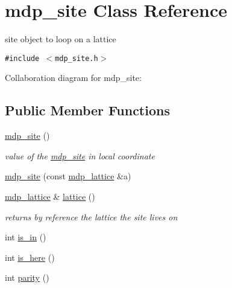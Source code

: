 \hypertarget{classmdp__site}{
\section{mdp\_\-site Class Reference}
\label{classmdp__site}
}
site object to loop on a lattice  


{\tt \#include $<$mdp\_\-site.h$>$}

Collaboration diagram for mdp\_\-site:\subsection*{Public Member Functions}
\begin{CompactItemize}
\item 
\hypertarget{classmdp__site_9c6937993f8faf46420b724f03f3649d}{
\hyperlink{classmdp__site_9c6937993f8faf46420b724f03f3649d}{mdp\_\-site} ()}
\label{classmdp__site_9c6937993f8faf46420b724f03f3649d}

\begin{CompactList}\small\item\em value of the \hyperlink{classmdp__site}{mdp\_\-site} in local coordinate \item\end{CompactList}\item 
\hyperlink{classmdp__site_b61e8e96573d58449ee28b9505ca799b}{mdp\_\-site} (const \hyperlink{classmdp__lattice}{mdp\_\-lattice} \&a)
\item 
\hypertarget{classmdp__site_ae3a1de2fd7fafccbd1d6bd971c908c4}{
\hyperlink{classmdp__lattice}{mdp\_\-lattice} \& \hyperlink{classmdp__site_ae3a1de2fd7fafccbd1d6bd971c908c4}{lattice} ()}
\label{classmdp__site_ae3a1de2fd7fafccbd1d6bd971c908c4}

\begin{CompactList}\small\item\em returns by reference the lattice the site lives on \item\end{CompactList}\item 
int \hyperlink{classmdp__site_57ff5d47780a90ad36c9368360ad2d89}{is\_\-in} ()
\item 
int \hyperlink{classmdp__site_1457471b74c722514712f1efb1093f63}{is\_\-here} ()
\item 
\hypertarget{classmdp__site_0b36dc1179dac2b0737dda900f135194}{
int \hyperlink{classmdp__site_0b36dc1179dac2b0737dda900f135194}{parity} ()}
\label{classmdp__site_0b36dc1179dac2b0737dda900f135194}


\end{CompactItemize}
